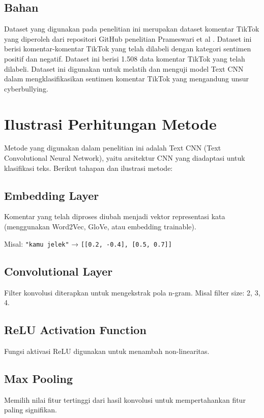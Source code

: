 \subsection{Bahan} \label{III.Bahan}
Dataset yang digunakan pada penelitian ini merupakan dataset komentar TikTok yang diperoleh dari repositori GitHub penelitian Prameswari et al \cite{10468424}. Dataset ini berisi komentar-komentar TikTok yang telah dilabeli dengan kategori sentimen positif dan negatif. Dataset ini berisi 1.508 data komentar TikTok yang telah dilabeli. Dataset ini digunakan untuk melatih dan menguji model Text CNN dalam mengklasifikasikan sentimen komentar TikTok yang mengandung unsur cyberbullying.

\section{Ilustrasi Perhitungan Metode} \label{III.Ilustrasi}
Metode yang digunakan dalam penelitian ini adalah Text CNN (Text Convolutional Neural Network), yaitu arsitektur CNN yang diadaptasi untuk klasifikasi teks. Berikut tahapan dan ilustrasi metode: \par

\subsection{Embedding Layer}
Komentar yang telah diproses diubah menjadi vektor representasi kata (menggunakan Word2Vec, GloVe, atau embedding trainable). \par
Misal: \texttt{"kamu jelek"} → \texttt{[[0.2, -0.4], [0.5, 0.7]]}

\subsection{Convolutional Layer}
Filter konvolusi diterapkan untuk mengekstrak pola n-gram.
Misal filter size: 2, 3, 4.

\subsection{ReLU Activation Function}
Fungsi aktivasi ReLU digunakan untuk menambah non-linearitas.

\subsection{Max Pooling}
Memilih nilai fitur tertinggi dari hasil konvolusi untuk mempertahankan fitur paling signifikan.

